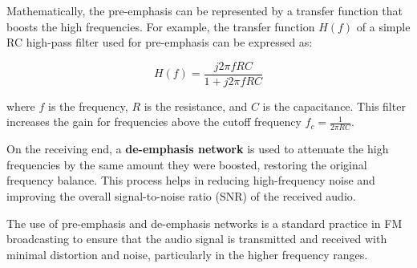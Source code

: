 Mathematically, the pre-emphasis can be represented by a transfer function that boosts the high frequencies. For example, the transfer function \( H(f) \) of a simple RC high-pass filter used for pre-emphasis can be expressed as:

\[
H(f) = \frac{j2\pi fRC}{1 + j2\pi fRC}
\]

where \( f \) is the frequency, \( R \) is the resistance, and \( C \) is the capacitance. This filter increases the gain for frequencies above the cutoff frequency \( f_c = \frac{1}{2\pi RC} \).

On the receiving end, a \textbf{de-emphasis network} is used to attenuate the high frequencies by the same amount they were boosted, restoring the original frequency balance. This process helps in reducing high-frequency noise and improving the overall signal-to-noise ratio (SNR) of the received audio.

The use of pre-emphasis and de-emphasis networks is a standard practice in FM broadcasting to ensure that the audio signal is transmitted and received with minimal distortion and noise, particularly in the higher frequency ranges.

